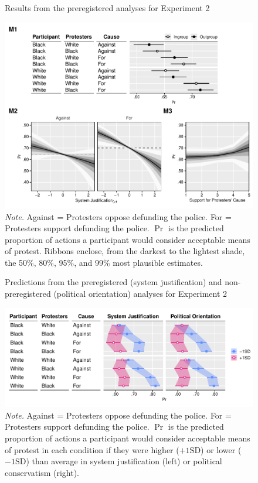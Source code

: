 \documentclass[12pt, letterpaper]{article}
\begin{document}
\begin{figure}[!t]
\centering
\caption{Results from the preregistered analyses for Experiment 2}
\includegraphics[scale=1]{../Experiment 2/figures/figure-4}
\caption*{\textit{Note.} Against = Protesters oppose defunding the police. For = Protesters support defunding the police. $\Pr$ is the predicted proportion of actions a participant would consider acceptable means of protest. Ribbons enclose, from the darkest to the lightest shade, the 50\%, 80\%, 95\%, and 99\% most plausible estimates.}
\label{fig:f4}
\end{figure}

\begin{figure}[!t]
\centering
\caption{Predictions from the preregistered (system justification) and non-preregistered (political orientation) analyses for Experiment 2}
\includegraphics[scale=1]{../Experiment 2/figures/figure-5}
\caption*{\textit{Note.} Against = Protesters oppose defunding the police. For = Protesters support defunding the police. $\Pr$ is the predicted proportion of actions a participant would consider acceptable means of protest in each condition if they were higher ($+1\text{SD}$) or lower ($-1\text{SD}$) than average in system justification (left) or political conservatism (right).}
\label{fig:f5}
\end{figure}
\end{document}

